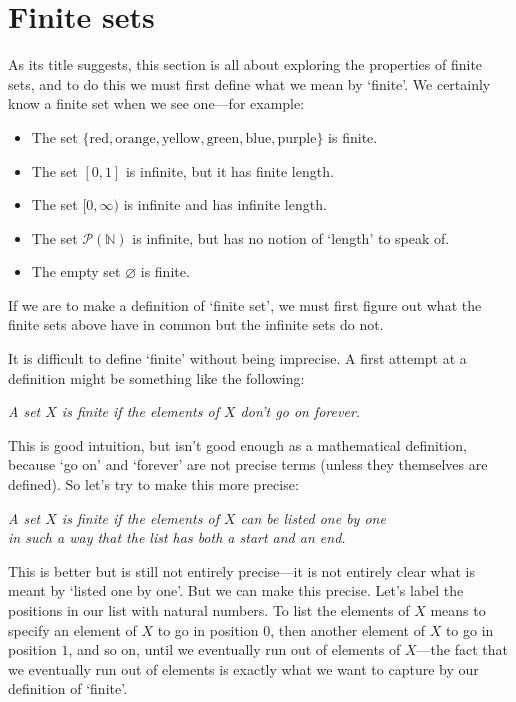 \section{Finite sets}

As its title suggests, this section is all about exploring the properties of finite sets, and to do this we must first define what we mean by `finite'. We certainly know a finite set when we see one---for example:
\begin{itemize}
\item The set $\{ \text{red}, \text{orange}, \text{yellow}, \text{green}, \text{blue}, \text{purple} \}$ is finite.
\item The set $[0,1]$ is infinite, but it has finite length.
\item The set $[0,\infty)$ is infinite and has infinite length.
\item The set $\mathcal{P}(\mathbb{N})$ is infinite, but has no notion of `length' to speak of.
\item The empty set $\varnothing$ is finite.
\end{itemize}

If we are to make a definition of `finite set', we must first figure out what the finite sets above have in common but the infinite sets do not.

It is difficult to define `finite' without being imprecise. A first attempt at a definition might be something like the following:
\begin{center}
\textit{A set $X$ is finite if the elements of $X$ don't go on forever.}
\end{center}
This is good intuition, but isn't good enough as a mathematical definition, because `go on' and `forever' are not precise terms (unless they themselves are defined). So let's try to make this more precise:
\begin{center}
\textit{A set $X$ is finite if the elements of $X$ can be listed one by one\\
in such a way that the list has both a start and an end.}
\end{center}
This is better but is still not entirely precise---it is not entirely clear what is meant by `listed one by one'. But we can make this precise. Let's label the positions in our list with natural numbers. To list the elements of $X$ means to specify an element of $X$ to go in position $0$, then another element of $X$ to go in position $1$, and so on, until we eventually run out of elements of $X$---the fact that we eventually run out of elements is exactly what we want to capture by our definition of `finite'.

